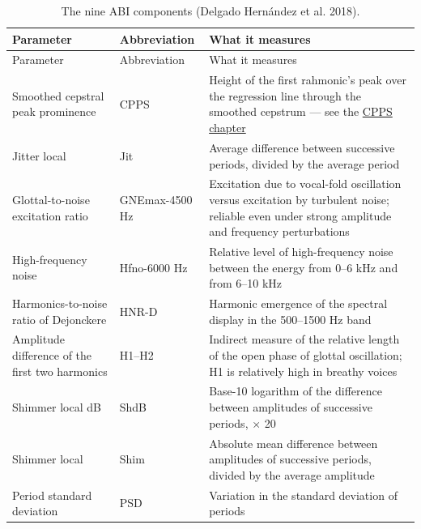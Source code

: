 \documentclass[
  english,
  letterpaper,
]{scrbook}
\begin{document}
\begin{longtable}[]{@{}
  >{\raggedright\arraybackslash}p{}
  >{\raggedright\arraybackslash}p{}
  >{\raggedright\arraybackslash}p{}@{}}
\caption{The nine ABI components (Delgado Hernández et al.
2018).}\label{tbl-abi-components}\tabularnewline
\toprule\noalign{}
\begin{minipage}[b]{\linewidth}\raggedright
Parameter
\end{minipage} & \begin{minipage}[b]{\linewidth}\raggedright
Abbreviation
\end{minipage} & \begin{minipage}[b]{\linewidth}\raggedright
What it measures
\end{minipage} \\
\midrule\noalign{}
\endfirsthead
\toprule\noalign{}
\begin{minipage}[b]{\linewidth}\raggedright
Parameter
\end{minipage} & \begin{minipage}[b]{\linewidth}\raggedright
Abbreviation
\end{minipage} & \begin{minipage}[b]{\linewidth}\raggedright
What it measures
\end{minipage} \\
\midrule\noalign{}
\endhead
\bottomrule\noalign{}
\endlastfoot
Smoothed cepstral peak prominence & CPPS & Height of the first
rahmonic's peak over the regression line through the smoothed cepstrum
--- see the \hyperref[cepstral-peak-prominence-cpp-and-cpps]{CPPS
chapter} \\
Jitter local & Jit & Average difference between successive periods,
divided by the average period \\
Glottal-to-noise excitation ratio & GNEmax-4500 Hz & Excitation due to
vocal-fold oscillation versus excitation by turbulent noise; reliable
even under strong amplitude and frequency perturbations \\
High-frequency noise & Hfno-6000 Hz & Relative level of high-frequency
noise between the energy from 0--6 kHz and from 6--10 kHz \\
Harmonics-to-noise ratio of Dejonckere & HNR-D & Harmonic emergence of
the spectral display in the 500--1500 Hz band \\
Amplitude difference of the first two harmonics & H1--H2 & Indirect
measure of the relative length of the open phase of glottal oscillation;
H1 is relatively high in breathy voices \\
Shimmer local dB & ShdB & Base-10 logarithm of the difference between
amplitudes of successive periods, × 20 \\
Shimmer local & Shim & Absolute mean difference between amplitudes of
successive periods, divided by the average amplitude \\
Period standard deviation & PSD & Variation in the standard deviation of
periods \\
\end{longtable}
\end{document}

